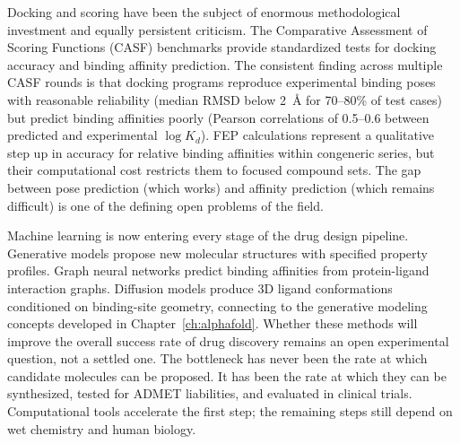 Docking and scoring have been the subject of enormous methodological investment and equally persistent criticism. The Comparative Assessment of Scoring Functions (CASF) benchmarks provide standardized tests for docking accuracy and binding affinity prediction. The consistent finding across multiple CASF rounds is that docking programs reproduce experimental binding poses with reasonable reliability (median RMSD below 2~\AA{} for 70--80\% of test cases) but predict binding affinities poorly (Pearson correlations of 0.5--0.6 between predicted and experimental $\log K_d$). FEP calculations represent a qualitative step up in accuracy for relative binding affinities within congeneric series, but their computational cost restricts them to focused compound sets. The gap between pose prediction (which works) and affinity prediction (which remains difficult) is one of the defining open problems of the field.

Machine learning is now entering every stage of the drug design pipeline. Generative models propose new molecular structures with specified property profiles. Graph neural networks predict binding affinities from protein-ligand interaction graphs. Diffusion models produce 3D ligand conformations conditioned on binding-site geometry, connecting to the generative modeling concepts developed in Chapter~\ref{ch:alphafold}. Whether these methods will improve the overall success rate of drug discovery remains an open experimental question, not a settled one. The bottleneck has never been the rate at which candidate molecules can be proposed. It has been the rate at which they can be synthesized, tested for ADMET liabilities, and evaluated in clinical trials. Computational tools accelerate the first step; the remaining steps still depend on wet chemistry and human biology.

\endinput
